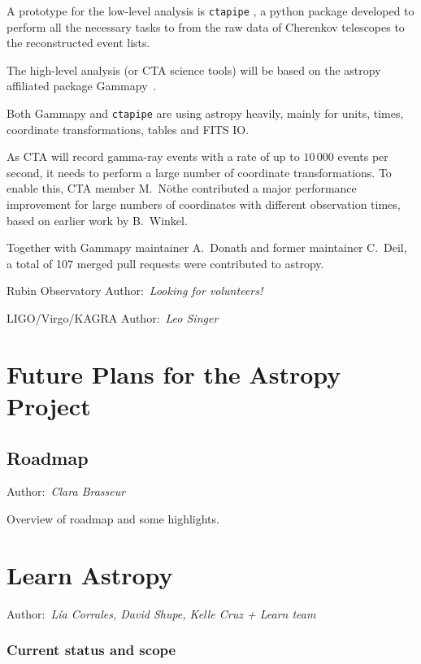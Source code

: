 \documentclass[modern]{aastex631}
\newcommand{\secauthor}[1]{{\color{blue}Author:~\textit{#1}}}
\newcommand{\secunfilled}{{\color{red}Author:~\textit{Looking for volunteers!}}}
\begin{document}
A prototype for the low-level analysis is \texttt{ctapipe} \citep{ctapipe},
a python package developed to perform all the necessary tasks to from the raw data
of Cherenkov telescopes to the reconstructed event lists.

The high-level analysis (or CTA science tools) will be based on the astropy affiliated package
Gammapy~\citep{gammapy}.

Both Gammapy and \texttt{ctapipe} are using astropy heavily, mainly for units, times, coordinate transformations,
tables and FITS IO.

As CTA will record gamma-ray events with a rate of up to $10\,000$ events per second,
it needs to perform a large number of coordinate transformations.
To enable this, CTA member M.~Nöthe contributed a major performance improvement
for large numbers of coordinates with different observation times,
based on earlier work by B.~Winkel.

Together with Gammapy maintainer A.~Donath and former maintainer C.~Deil,
a total of 107 merged pull requests were contributed to astropy.


Rubin Observatory
\secunfilled

LIGO/Virgo/KAGRA
\secauthor{Leo Singer}
\section{Future Plans for the Astropy Project} \label{sec:future}

\subsection{Roadmap}

\secauthor{Clara Brasseur}

Overview of roadmap and some highlights.

\section{Learn Astropy} \label{sec:learn}

\secauthor{Lía Corrales, David Shupe, Kelle Cruz + Learn team}

\subsubsection{Current status and scope}
\end{document}
